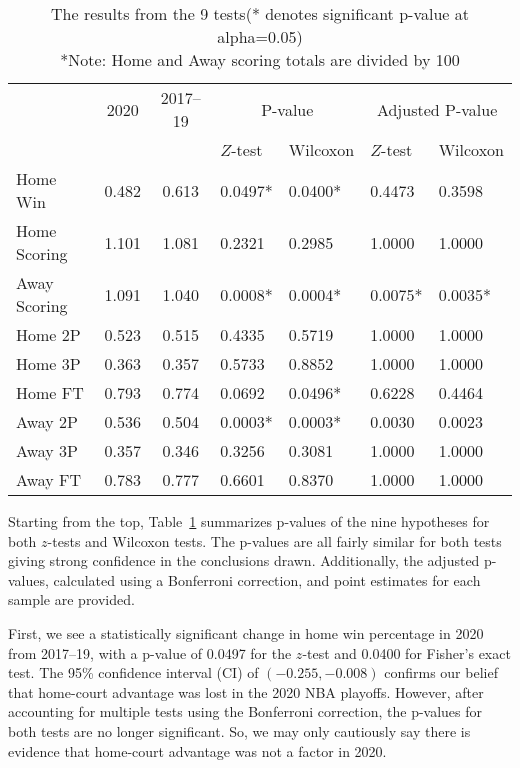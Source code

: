 \documentclass[10pt]{article}
\begin{document}
\begin{table}[tbp]
  \caption{The results from the 9 tests(* denotes significant p-value at alpha=0.05)
  \\*Note: Home and Away scoring totals are divided by 100}
  \label{tab:table}
\centering
\begin{tabular}[t]{lccllll}
  \toprule
  & 2020 & 2017--19 & \multicolumn{2}{c}{P-value} & \multicolumn{2}{c}{Adjusted P-value}\\
\cmidrule(lr){4-5}\cmidrule(lr){6-7}
  &          &                & \(Z\)-test & Wilcoxon & \(Z\)-test & Wilcoxon\\
  \midrule
  Home Win & 0.482 & 0.613 & 0.0497* & 0.0400* & 0.4473 & 0.3598\\
  \midrule
Home Scoring & 1.101 & 1.081 & 0.2321 & 0.2985 & 1.0000 & 1.0000\\
\midrule
Away Scoring & 1.091 & 1.040 & 0.0008* & 0.0004* & 0.0075* & 0.0035*\\
\midrule
Home 2P & 0.523 & 0.515 & 0.4335 & 0.5719 & 1.0000 & 1.0000\\
\midrule
Home 3P & 0.363 & 0.357 & 0.5733 & 0.8852 & 1.0000 & 1.0000\\
\midrule
Home FT & 0.793 & 0.774 & 0.0692 & 0.0496* & 0.6228 & 0.4464\\
\midrule
Away 2P & 0.536 & 0.504 & 0.0003* & 0.0003* & 0.0030 & 0.0023\\
\midrule
Away 3P & 0.357 & 0.346 & 0.3256 & 0.3081 & 1.0000 & 1.0000\\
\midrule
Away FT & 0.783 & 0.777 & 0.6601 & 0.8370 & 1.0000 & 1.0000\\
  \bottomrule
\end{tabular}
\end{table}

Starting from the top,
Table~\ref{tab:table} summarizes p-values of the nine hypotheses for both
\(z\)-tests and Wilcoxon tests. The p-values are all fairly similar for both
tests giving strong confidence in the conclusions drawn. Additionally, the adjusted
p-values, calculated using a Bonferroni correction, and point estimates
for each sample are provided.

First, we see a statistically significant change
in home win percentage in 2020 from 2017--19, with a p-value of 0.0497 for the
\(z\)-test and 0.0400 for Fisher's exact test. The 95\% confidence
interval (CI) of \((-0.255, -0.008)\)
confirms our belief that home-court advantage was lost in the 2020 NBA 
playoffs. However, after accounting for
multiple tests using the Bonferroni correction, the p-values for both
tests are no longer significant. So, we may only cautiously say there is 
evidence that home-court advantage was
not a factor in 2020.
\end{document}
